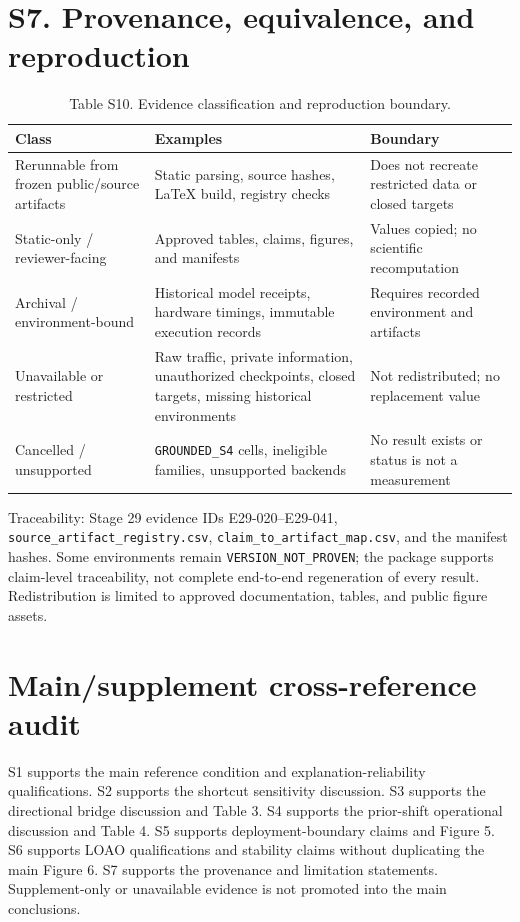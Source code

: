 \documentclass[preprint,12pt]{elsarticle}
\begin{document}
\section*{S7. Provenance, equivalence, and reproduction}
\begin{table}[htbp]
\centering\scriptsize
\caption{Table S10. Evidence classification and reproduction boundary.}
\begin{tabularx}{\textwidth}{@{}lXX@{}}
\toprule
Class & Examples & Boundary\\
\midrule
Rerunnable from frozen public/source artifacts & Static parsing, source hashes, LaTeX build, registry checks & Does not recreate restricted data or closed targets\\
Static-only / reviewer-facing & Approved tables, claims, figures, and manifests & Values copied; no scientific recomputation\\
Archival / environment-bound & Historical model receipts, hardware timings, immutable execution records & Requires recorded environment and artifacts\\
Unavailable or restricted & Raw traffic, private information, unauthorized checkpoints, closed targets, missing historical environments & Not redistributed; no replacement value\\
Cancelled / unsupported & \texttt{GROUNDED\_S4} cells, ineligible families, unsupported backends & No result exists or status is not a measurement\\
\bottomrule
\end{tabularx}
\end{table}
Traceability: Stage 29 evidence IDs E29-020--E29-041, \texttt{source\_artifact\_registry.csv}, \texttt{claim\_to\_artifact\_map.csv}, and the manifest hashes. Some environments remain \texttt{VERSION\_NOT\_PROVEN}; the package supports claim-level traceability, not complete end-to-end regeneration of every result. Redistribution is limited to approved documentation, tables, and public figure assets.

\section*{Main/supplement cross-reference audit}
S1 supports the main reference condition and explanation-reliability qualifications. S2 supports the shortcut sensitivity discussion. S3 supports the directional bridge discussion and Table 3. S4 supports the prior-shift operational discussion and Table 4. S5 supports deployment-boundary claims and Figure 5. S6 supports LOAO qualifications and stability claims without duplicating the main Figure 6. S7 supports the provenance and limitation statements. Supplement-only or unavailable evidence is not promoted into the main conclusions.
\end{document}

